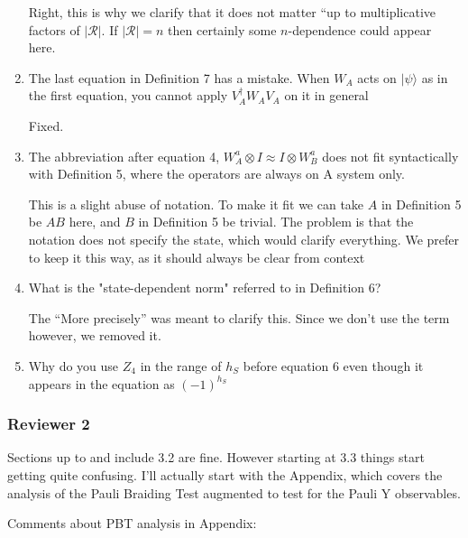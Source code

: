 \documentclass[12pt]{article}
\newcommand{\ket}[1]{|#1\rangle}
\begin{document}
\begin{enumerate}
{\color{blue} Right, this is why we clarify that it does not matter ``up to multiplicative factors of $|\mathcal{R}|$. If $|\mathcal{R}|=n$ then certainly some $n$-dependence could appear here. }

\item The last equation in Definition 7 has a mistake. When $W_A$ acts on $\ket{\psi}$ as in the first equation, you cannot apply $V^\dagger_A W_A V_A$ on it in general

{\color{blue} Fixed.}

\item The abbreviation after equation 4, $W^a_A \otimes I \approx I \otimes W^a_B$ does not fit syntactically with Definition 5, where the operators are always on A system only.

{\color{blue} This is a slight abuse of notation. To make it fit we can take $A$ in Definition 5 be $AB$ here, and $B$ in Definition 5 be trivial. The problem is that the notation does not specify the state, which would clarify everything. We prefer to keep it this way, as it should always be clear from context}

\item What is the "state-dependent norm" referred to in Definition 6?

{\color{blue} The ``More precisely'' was meant to clarify this. Since we don't use the term however, we removed it.}

\item Why do you use $Z_4$ in the range of $h_S$ before equation 6 even though it appears in the equation as $(-1)^{h_S}$
\end{enumerate}

\subsubsection*{Reviewer 2}

Sections up to and include 3.2 are fine. However starting at 3.3 things start getting quite confusing. I'll actually start with the Appendix, which covers the analysis of the Pauli Braiding Test augmented to test for the Pauli Y observables.

Comments about PBT analysis in Appendix:
\end{document}
